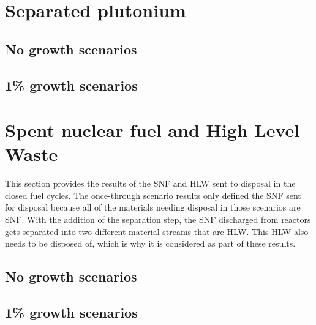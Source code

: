 \section{Separated plutonium}

\subsection{No growth scenarios}

\subsection{1\% growth scenarios}

\section{Spent nuclear fuel and High Level Waste}
This section provides the results of the \gls{SNF} and \gls{HLW} sent 
to disposal in the closed fuel cycles. The once-through scenario 
results only defined the \gls{SNF} sent for disposal because all 
of the materials needing disposal in those scenarios are \gls{SNF}. 
With the addition of the separation step, the \gls{SNF} discharged 
from reactors gets separated into two different material streams 
that are \gls{HLW}. This \gls{HLW} also needs to be disposed of, 
which is why it is considered as part of these results. 

\subsection{No growth scenarios}

\subsection{1\% growth scenarios}